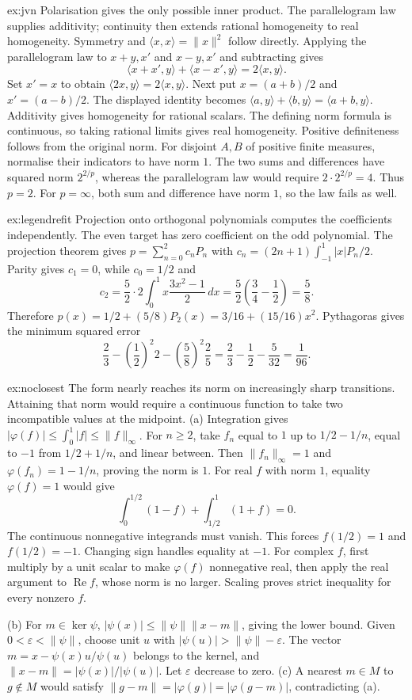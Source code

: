 \begin{solution}{ex:jvn}
\idea Polarisation gives the only possible inner product. The parallelogram law supplies additivity; continuity then extends rational homogeneity to real homogeneity.
\writeup Symmetry and $\langle x,x\rangle=\|x\|^2$ follow directly. Applying the parallelogram law to $x+y,x'$ and $x-y,x'$ and subtracting gives
\[\langle x+x',y\rangle+\langle x-x',y\rangle=2\langle x,y\rangle.\]
Set $x'=x$ to obtain $\langle2x,y\rangle=2\langle x,y\rangle$. Next put $x=(a+b)/2$ and $x'=(a-b)/2$. The displayed identity becomes $\langle a,y\rangle+\langle b,y\rangle=\langle a+b,y\rangle$. Additivity gives homogeneity for rational scalars. The defining norm formula is continuous, so taking rational limits gives real homogeneity. Positive definiteness follows from the original norm. For disjoint $A,B$ of positive finite measures, normalise their indicators to have norm $1$. The two sums and differences have squared norm $2^{2/p}$, whereas the parallelogram law would require $2\cdot2^{2/p}=4$. Thus $p=2$. For $p=\infty$, both sum and difference have norm $1$, so the law fails as well.
\end{solution}
\begin{solution}{ex:legendrefit}
\idea Projection onto orthogonal polynomials computes the coefficients independently. The even target has zero coefficient on the odd polynomial.
\writeup The projection theorem gives $p=\sum_{n=0}^2c_nP_n$ with $c_n=(2n+1)\int_{-1}^1|x|P_n/2$. Parity gives $c_1=0$, while $c_0=1/2$ and
\[c_2=\frac52\cdot2\int_0^1x\frac{3x^2-1}2\,dx=\frac52\left(\frac34-\frac12\right)=\frac58.\]
Therefore $p(x)=1/2+(5/8)P_2(x)=3/16+(15/16)x^2$. Pythagoras gives the minimum squared error
\[\frac23-\left(\frac12\right)^2 2-\left(\frac58\right)^2\frac25=\frac23-\frac12-\frac5{32}=\frac1{96}.\]
\end{solution}
\begin{solution}{ex:noclosest}
\idea The form nearly reaches its norm on increasingly sharp transitions. Attaining that norm would require a continuous function to take two incompatible values at the midpoint.
\writeup (a) Integration gives $|\varphi(f)|\le\int_0^1|f|\le\|f\|_\infty$. For $n\ge2$, take $f_n$ equal to $1$ up to $1/2-1/n$, equal to $-1$ from $1/2+1/n$, and linear between. Then $\|f_n\|_\infty=1$ and $\varphi(f_n)=1-1/n$, proving the norm is $1$. For real $f$ with norm $1$, equality $\varphi(f)=1$ would give
\[\int_0^{1/2}(1-f)+\int_{1/2}^1(1+f)=0.\]
The continuous nonnegative integrands must vanish. This forces $f(1/2)=1$ and $f(1/2)=-1$. Changing sign handles equality at $-1$. For complex $f$, first multiply by a unit scalar to make $\varphi(f)$ nonnegative real, then apply the real argument to $\operatorname{Re}f$, whose norm is no larger. Scaling proves strict inequality for every nonzero $f$.

(b) For $m\in\ker\psi$, $|\psi(x)|\le\|\psi\|\|x-m\|$, giving the lower bound. Given $0<\varepsilon<\|\psi\|$, choose unit $u$ with $|\psi(u)|>\|\psi\|-\varepsilon$. The vector $m=x-\psi(x)u/\psi(u)$ belongs to the kernel, and $\|x-m\|=|\psi(x)|/|\psi(u)|$. Let $\varepsilon$ decrease to zero. (c) A nearest $m\in M$ to $g\notin M$ would satisfy $\|g-m\|=|\varphi(g)|=|\varphi(g-m)|$, contradicting (a).
\end{solution}
